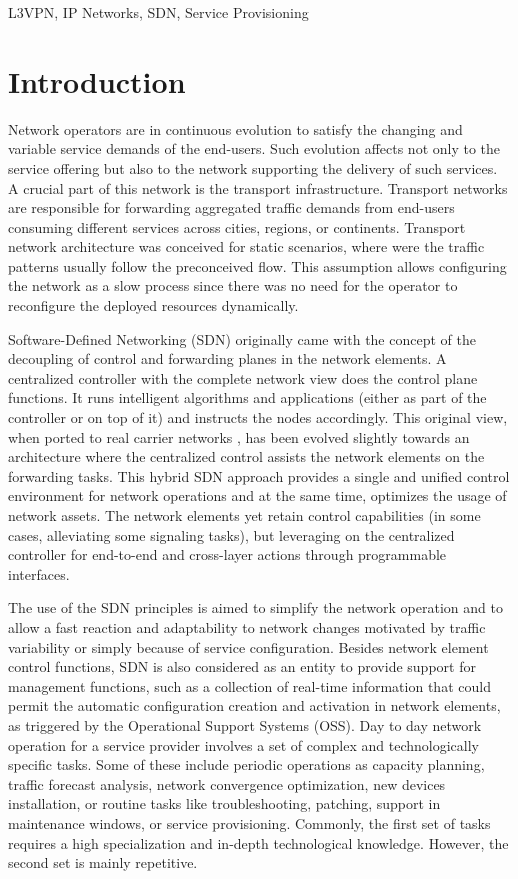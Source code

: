 \documentclass[conference]{IEEEtran}
\begin{document}
\begin{IEEEkeywords}
L3VPN, IP Networks, SDN, Service Provisioning
\end{IEEEkeywords}

\section{Introduction}
Network operators are in continuous evolution to satisfy the changing and variable service demands of the end-users. Such evolution affects not only to the service offering but also to the network supporting the delivery of such services. A crucial part of this network is the transport infrastructure. Transport networks are responsible for forwarding aggregated traffic demands from end-users consuming different services across cities, regions, or continents. Transport network architecture was conceived for static scenarios, where were the traffic patterns usually follow the preconceived flow. This assumption allows configuring the network as a slow process since there was no need for the operator to reconfigure the deployed resources dynamically.

Software-Defined Networking (SDN) originally \cite{brief2014openflow,gude2008nox,tavakoli2009applying} came with the concept of the decoupling of control and forwarding planes in the network elements. A centralized controller with the complete network view does the control plane functions. It runs intelligent algorithms and applications (either as part of the controller or on top of it) and instructs the nodes accordingly. This original view, when ported to real carrier networks \cite{bemby2015vino}, has been evolved slightly towards an architecture where the centralized control assists the network elements on the forwarding tasks. This hybrid SDN approach provides a single and unified control environment for network operations and at the same time, optimizes the usage of network assets. The network elements yet retain control capabilities (in some cases, alleviating some signaling tasks), but leveraging on the centralized controller for end-to-end and cross-layer actions through programmable interfaces. 

The use of the SDN principles is aimed to simplify the network operation and to allow a fast reaction and adaptability to network changes motivated by traffic variability or simply because of service configuration. Besides network element control functions, SDN is also considered as an entity to provide support for management functions, such as a collection of real-time information that could permit the automatic configuration creation and activation in network elements, as triggered by the Operational Support Systems (OSS). Day to day network operation for a service provider involves a set of complex and technologically specific tasks. Some of these include periodic operations as capacity planning, traffic forecast analysis, network convergence optimization, new devices installation, or routine tasks like troubleshooting, patching, support in maintenance windows, or service provisioning. Commonly, the first set of tasks requires a high specialization and in-depth technological knowledge. However, the second set is mainly repetitive. 
\end{document}
